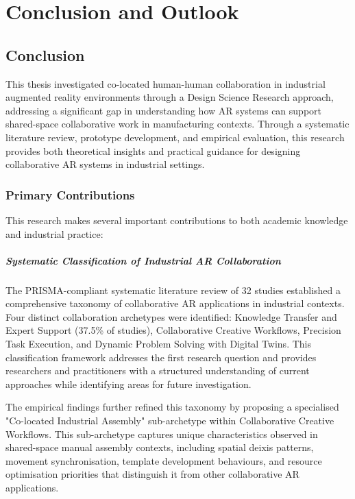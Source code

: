 \chapter{Conclusion and Outlook}\label{chapter:conclusion-outlook}

\section{Conclusion}

This thesis investigated co-located human-human collaboration in industrial augmented reality environments through a Design Science Research approach, addressing a significant gap in understanding how AR systems can support shared-space collaborative work in manufacturing contexts. Through a systematic literature review, prototype development, and empirical evaluation, this research provides both theoretical insights and practical guidance for designing collaborative AR systems in industrial settings.

\subsection{Primary Contributions}

This research makes several important contributions to both academic knowledge and industrial practice:

\paragraph{Systematic Classification of Industrial AR Collaboration}
The PRISMA-compliant systematic literature review of 32 studies established a comprehensive taxonomy of collaborative AR applications in industrial contexts. Four distinct collaboration archetypes were identified: Knowledge Transfer and Expert Support (37.5\% of studies), Collaborative Creative Workflows, Precision Task Execution, and Dynamic Problem Solving with Digital Twins. This classification framework addresses the first research question and provides researchers and practitioners with a structured understanding of current approaches while identifying areas for future investigation.

The empirical findings further refined this taxonomy by proposing a specialised "Co-located Industrial Assembly" sub-archetype within Collaborative Creative Workflows. This sub-archetype captures unique characteristics observed in shared-space manual assembly contexts, including spatial deixis patterns, movement synchronisation, template development behaviours, and resource optimisation priorities that distinguish it from other collaborative AR applications.


